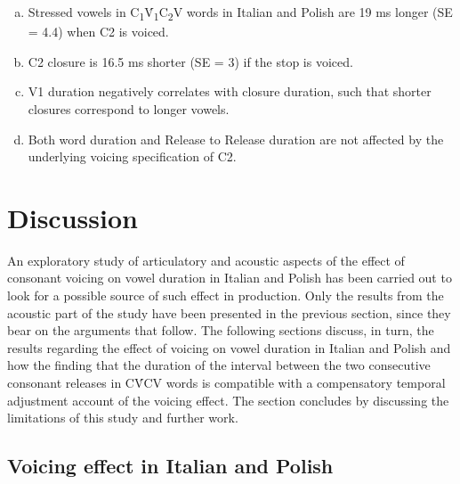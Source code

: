 \documentclass[12pt,]{article}
\begin{document}
\begin{enumerate}[(a)]
  \item Stressed vowels in C\textsubscript{1}V́\textsubscript{1}C\textsubscript{2}V words in Italian and Polish are 19 ms longer (SE = 4.4) when C2 is voiced.
  \item C2 closure is 16.5 ms shorter (SE = 3) if the stop is voiced.
  \item V1 duration negatively correlates with closure duration, such that shorter closures correspond to longer vowels.
  \item Both word duration and Release to Release duration are not affected by the underlying voicing specification of C2.
\end{enumerate}

\hypertarget{discussion}{%
\section{Discussion}\label{discussion}}

\label{s:discussion}

An exploratory study of articulatory and acoustic aspects of the effect
of consonant voicing on vowel duration in Italian and Polish has been
carried out to look for a possible source of such effect in production.
Only the results from the acoustic part of the study have been presented
in the previous section, since they bear on the arguments that follow.
The following sections discuss, in turn, the results regarding the
effect of voicing on vowel duration in Italian and Polish and how the
finding that the duration of the interval between the two consecutive
consonant releases in CV́CV words is compatible with a compensatory
temporal adjustment account of the voicing effect. The section concludes
by discussing the limitations of this study and further work.

\hypertarget{voicing-effect-in-italian-and-polish}{%
\subsection{Voicing effect in Italian and
Polish}\label{voicing-effect-in-italian-and-polish}}
\end{document}
